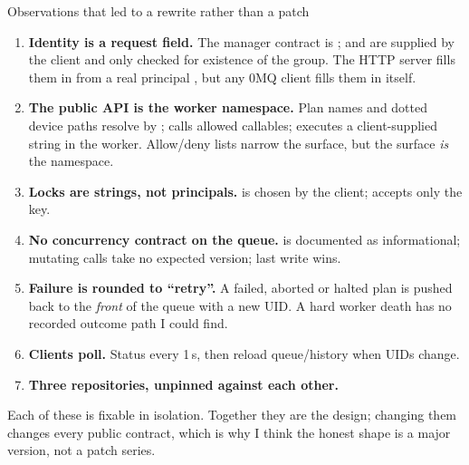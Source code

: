\begin{frame}{Observations that led to a rewrite rather than a patch}
    \small
    \begin{enumerate}
        \item \textbf{Identity is a request field.} The manager contract is ;
               and  are supplied by the client and only checked for
              existence of the group. 
              The HTTP server fills them in from a real principal ,
              but any 0MQ client fills them in itself. 
        \item \textbf{The public API is the worker namespace.} Plan names and dotted device paths
              resolve by  ;
               calls allowed callables;  executes a
              client-supplied string in the worker. 
              Allow/deny lists narrow the surface, but the surface \emph{is} the namespace.
        \item \textbf{Locks are strings, not principals.}  is chosen by the client;
               accepts only the key. 
        \item \textbf{No concurrency contract on the queue.}  is documented as
              informational; mutating calls take no expected version; last write wins.
        \item \textbf{Failure is rounded to ``retry''.} A failed, aborted or halted plan is pushed back to
              the \emph{front} of the queue with a new UID. 
              A hard worker death has no recorded outcome path I could find. 
        \item \textbf{Clients poll.} Status every 1\,s, then reload queue/history when UIDs change.
        \item \textbf{Three repositories, unpinned against each other.}
    \end{enumerate}
    \vspace{0.1cm}
    {\color{qsgray} Each of these is fixable in isolation. Together they are the design; changing them
    changes every public contract, which is why I think the honest shape is a major version, not a patch series.}
\end{frame}
